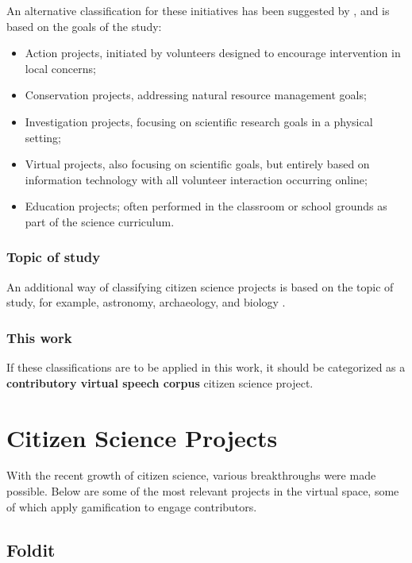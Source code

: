 An alternative classification for these initiatives has been suggested by \cite{wiggins2011conservation}, and is based on the goals of the study:

\begin{itemize}
    \item Action projects, initiated by volunteers designed to encourage intervention in local concerns;
    \item Conservation projects, addressing natural resource management goals;
    \item Investigation projects, focusing on scientific research goals in a physical setting;
    \item Virtual projects, also focusing on scientific goals, but entirely based on information technology with all volunteer interaction occurring online;
    \item Education projects; often performed in the classroom or school grounds as part of the science curriculum.
\end{itemize}

\subsubsection{Topic of study}

An additional way of classifying citizen science projects is based on the topic of study, for example, astronomy, archaeology, and biology \cite{wiggins2011conservation}. 

\subsubsection{This work}

If these classifications are to be applied in this work, it should be categorized as a \textbf{contributory virtual speech corpus} citizen science project.

\section{Citizen Science Projects}

With the recent growth of citizen science, various breakthroughs were made possible. Below are some of the most relevant projects in the virtual space, some of which apply gamification to engage contributors.

\subsection{Foldit}

